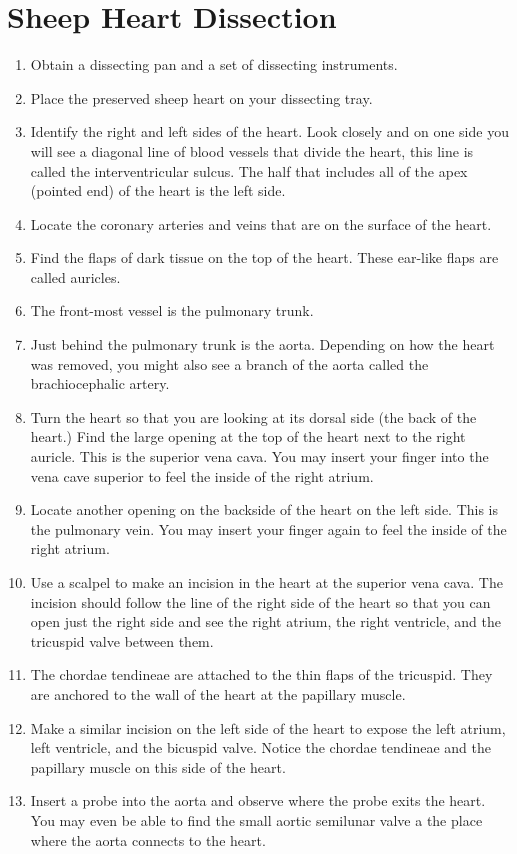 \documentclass[]{book}
\providecommand{\tightlist}{%
  \setlength{\itemsep}{0pt}\setlength{\parskip}{0pt}}
\begin{document}
\hypertarget{sheep-heart-dissection}{%
\section{Sheep Heart Dissection}\label{sheep-heart-dissection}}

\begin{enumerate}
\def\labelenumi{\arabic{enumi}.}
\tightlist
\item
  Obtain a dissecting pan and a set of dissecting instruments.
\item
  Place the preserved sheep heart on your dissecting tray.
\item
  Identify the right and left sides of the heart. Look closely and on one side you will see a diagonal line of blood vessels that divide the heart, this line is called the interventricular sulcus. The half that includes all of the apex (pointed end) of the heart is the left side.
\item
  Locate the coronary arteries and veins that are on the surface of the heart.
\item
  Find the flaps of dark tissue on the top of the heart. These ear-like flaps are called auricles.
\item
  The front-most vessel is the pulmonary trunk.
\item
  Just behind the pulmonary trunk is the aorta. Depending on how the heart was removed, you might also see a branch of the aorta called the brachiocephalic artery.
\item
  Turn the heart so that you are looking at its dorsal side (the back of the heart.) Find the large opening at the top of the heart next to the right auricle. This is the superior vena cava. You may insert your finger into the vena cave superior to feel the inside of the right atrium.
\item
  Locate another opening on the backside of the heart on the left side. This is the pulmonary vein. You may insert your finger again to feel the inside of the right atrium.
\item
  Use a scalpel to make an incision in the heart at the superior vena cava. The incision should follow the line of the right side of the heart so that you can open just the right side and see the right atrium, the right ventricle, and the tricuspid valve between them.
\item
  The chordae tendineae are attached to the thin flaps of the tricuspid. They are anchored to the wall of the heart at the papillary muscle.
\item
  Make a similar incision on the left side of the heart to expose the left atrium, left ventricle, and the bicuspid valve. Notice the chordae tendineae and the papillary muscle on this side of the heart.
\item
  Insert a probe into the aorta and observe where the probe exits the heart. You may even be able to find the small aortic semilunar valve a the place where the aorta connects to the heart.
\end{enumerate}
\end{document}
